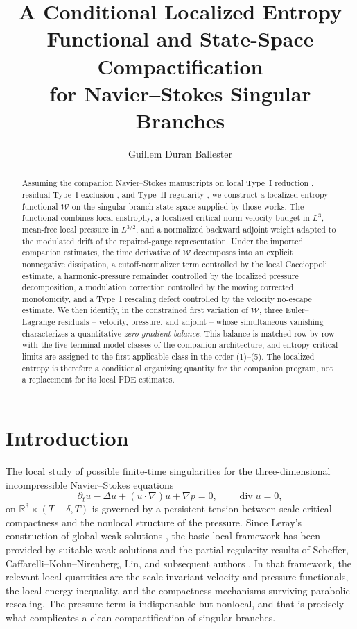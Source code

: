 \documentclass[11pt]{amsart}
\title[Conditional localized entropy and compactification]
{A Conditional Localized Entropy Functional and State-Space Compactification \\
for Navier--Stokes Singular Branches}
\author{Guillem Duran Ballester}
\date{}
\numberwithin{equation}{section}
\theoremstyle{plain}
\theoremstyle{definition}
\theoremstyle{remark}
\newcommand{\R}{\mathbb R}
\newcommand{\Wloc}{\mathcal W}
\newcommand{\diver}{\operatorname{div}}
\begin{document}
\begin{abstract}
Assuming the companion Navier--Stokes manuscripts on local Type~I reduction
\cite{BallesterSetup}, residual Type~I exclusion \cite{BallesterResidual},
and Type~II regularity \cite{BallesterTypeII}, we construct a localized
entropy functional \(\Wloc\) on the singular-branch state space supplied by
those works.  The functional combines local enstrophy, a localized
critical-norm velocity budget in \(L^3\), mean-free local pressure in
\(L^{3/2}\), and a
normalized backward adjoint weight adapted to the modulated drift of the
repaired-gauge representation.  Under the imported companion estimates, the
time derivative of \(\Wloc\) decomposes into an explicit nonnegative
dissipation, a cutoff-normalizer term controlled by the local Caccioppoli
estimate, a harmonic-pressure remainder controlled by the localized
pressure decomposition, a modulation correction controlled by the moving
corrected monotonicity, and a Type~I rescaling defect controlled by the
velocity no-escape estimate.  We then identify, in the constrained first
variation of \(\Wloc\), three Euler--Lagrange residuals -- velocity,
pressure, and adjoint -- whose simultaneous vanishing characterizes a
quantitative \emph{zero-gradient balance}.  This balance is matched
row-by-row with the five terminal model classes of the companion
architecture, and entropy-critical limits are assigned to the first
applicable class in the order (1)--(5).  The localized entropy is therefore
a conditional organizing quantity for the companion program, not a
replacement for its local PDE estimates.
\end{abstract}

\maketitle
\tableofcontents

\section{Introduction}

The local study of possible finite-time singularities for the
three-dimensional incompressible Navier--Stokes equations
\begin{equation}\label{eq:NS}
	\partial_t u - \Delta u + (u\cdot\nabla)u + \nabla p = 0,
	\qquad \diver u = 0,
\end{equation}
on \(\R^3\times(T-\delta,T)\) is governed by a persistent tension between
scale-critical compactness and the nonlocal structure of the pressure.  Since
Leray's construction of global weak solutions \cite{Leray1934}, the basic
local framework has been provided by suitable weak solutions and the partial
regularity results of Scheffer, Caffarelli--Kohn--Nirenberg, Lin, and
subsequent authors
\cite{Scheffer1976,CKN1982,Lin1998,GustafsonKangTsai2007}.  In that
framework, the relevant local quantities are the scale-invariant velocity
and pressure functionals, the local energy inequality, and the compactness
mechanisms surviving parabolic rescaling.  The pressure term is
indispensable but nonlocal, and that is precisely what complicates a clean
compactification of singular branches.
\end{document}
